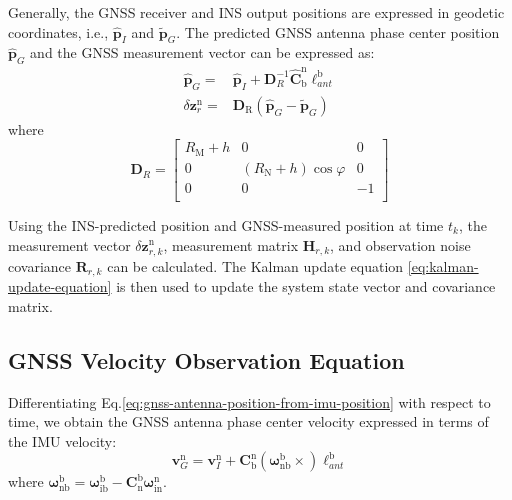 \documentclass{article}
\begin{document}
Generally, the GNSS receiver and INS output positions are expressed in geodetic coordinates, i.e., $\hat{\boldsymbol{p}}_{I}$ and $\tilde{\boldsymbol{p}}_{G}$. The predicted GNSS antenna phase center position $\hat{\boldsymbol{p}}_{G}$ and the GNSS measurement vector can be expressed as:
\begin{equation}
    \begin{aligned}
        \hat{\boldsymbol{p}}_{G} =& \hat{\boldsymbol{p}}_{I} + \boldsymbol{D}_{R}^{-1} \hat{\mathbf{C}}_{\mathrm{b}}^{\mathrm{n}}\boldsymbol{\ell}_{ant}^{\mathrm{b}} \\
        \delta \boldsymbol{z}_{r}^{\mathrm{n}} =& \boldsymbol{D}_{\mathrm{R}} \left(\hat{\boldsymbol{p}}_{G} - \tilde{\boldsymbol{p}}_{G}\right)
    \end{aligned}
\end{equation}
where
\begin{equation}
    \boldsymbol{D}_{R}=\left[ \begin{matrix}
        {R}_{\mathrm{M}}+{h}&		0&		0\\
        0&		\left( {R}_{\mathrm{N}}+{h} \right) \cos \varphi&		0\\
        0&		0&		-1\\
    \end{matrix} \right] 
\end{equation}

Using the INS-predicted position and GNSS-measured position at time $t_k$, the measurement vector $\delta \boldsymbol{z}_{r,k}^{\mathrm{n}}$, measurement matrix $\boldsymbol{H}_{r,k}$, and observation noise covariance $\boldsymbol{R}_{r,k}$ can be calculated. The Kalman update equation \eqref{eq:kalman-update-equation} is then used to update the system state vector and covariance matrix.

\subsection{GNSS Velocity Observation Equation}

Differentiating Eq.\eqref{eq:gnss-antenna-position-from-imu-position} with respect to time, we obtain the GNSS antenna phase center velocity expressed in terms of the IMU velocity:
\begin{equation}
    \label{eq:gnss-antenna-velocity-from-imu-velocity}
    \boldsymbol{v}_{G}^{\mathrm{n}} = \boldsymbol{v}_{I}^{\mathrm{n}} + \mathbf{C}_{\mathrm{b}}^{\mathrm{n}} \left(\boldsymbol{\omega}_{\mathrm{n} \mathrm{b}}^{\mathrm{b}} \times \right) \boldsymbol{\ell}_{ant}^{\mathrm{b}}
\end{equation}
where $\boldsymbol{\omega}_{\mathrm{n} \mathrm{b}}^{\mathrm{b}} = \boldsymbol{\omega}_{\mathrm{i} \mathrm{b}}^{\mathrm{b}} - \mathbf{C}_{\mathrm{n}}^{\mathrm{b}} \boldsymbol{\omega}_{\mathrm{in}}^{\mathrm{n}}$. 
\end{document}
